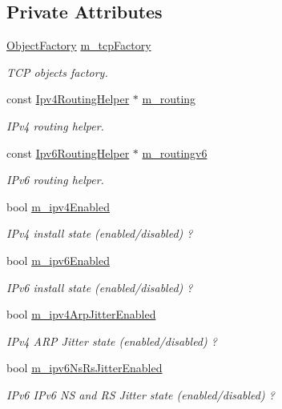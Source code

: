 \subsection*{Private Attributes}
\begin{DoxyCompactItemize}
\item 
\hyperlink{classns3_1_1ObjectFactory}{Object\+Factory} \hyperlink{classns3_1_1InternetStackHelper_a70733544910e58abfe1b238263ea5a68}{m\+\_\+tcp\+Factory}
\begin{DoxyCompactList}\small\item\em T\+CP objects factory. \end{DoxyCompactList}\item 
const \hyperlink{classns3_1_1Ipv4RoutingHelper}{Ipv4\+Routing\+Helper} $\ast$ \hyperlink{classns3_1_1InternetStackHelper_a575127688a08b5a2f3f8e07839ea9807}{m\+\_\+routing}
\begin{DoxyCompactList}\small\item\em I\+Pv4 routing helper. \end{DoxyCompactList}\item 
const \hyperlink{classns3_1_1Ipv6RoutingHelper}{Ipv6\+Routing\+Helper} $\ast$ \hyperlink{classns3_1_1InternetStackHelper_ab00253ad66b420c44ab0226d333c51dd}{m\+\_\+routingv6}
\begin{DoxyCompactList}\small\item\em I\+Pv6 routing helper. \end{DoxyCompactList}\item 
bool \hyperlink{classns3_1_1InternetStackHelper_a52b041bc6e084a821e6885c71d38df31}{m\+\_\+ipv4\+Enabled}
\begin{DoxyCompactList}\small\item\em I\+Pv4 install state (enabled/disabled) ? \end{DoxyCompactList}\item 
bool \hyperlink{classns3_1_1InternetStackHelper_a2eade9878232a41166cd0638cab7c3bf}{m\+\_\+ipv6\+Enabled}
\begin{DoxyCompactList}\small\item\em I\+Pv6 install state (enabled/disabled) ? \end{DoxyCompactList}\item 
bool \hyperlink{classns3_1_1InternetStackHelper_a9b4460c9d7b52d6ce2d390ffd1074bfa}{m\+\_\+ipv4\+Arp\+Jitter\+Enabled}
\begin{DoxyCompactList}\small\item\em I\+Pv4 A\+RP Jitter state (enabled/disabled) ? \end{DoxyCompactList}\item 
bool \hyperlink{classns3_1_1InternetStackHelper_a465f1786b918e4b3b3640d958d6e3212}{m\+\_\+ipv6\+Ns\+Rs\+Jitter\+Enabled}
\begin{DoxyCompactList}\small\item\em I\+Pv6 I\+Pv6 NS and RS Jitter state (enabled/disabled) ? \end{DoxyCompactList}\end{DoxyCompactItemize}


